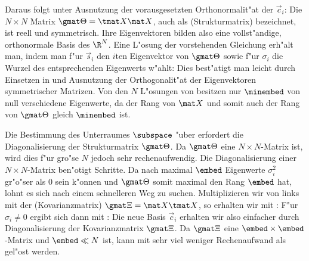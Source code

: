  Daraus folgt unter Ausnutzung der vorausgesetzten Orthonormalit"at der $\vec c_i$:
Die $N\times N$ Matrix $\gmat \Theta = \tmat X \mat X$,  auch
als \begriff(Strukturmatrix) bezeichnet, ist reell und symmetrisch. Ihre
Eigenvektoren bilden also eine vollst"andige, orthonormale Basis des $\R^N$. 
Eine L"osung der vorstehenden Gleichung erh"alt man, indem man f"ur $\vec s_i$ 
den $i$ten Eigenvektor von $\gmat \Theta$ sowie f"ur $\sigma_i$ die Wurzel des entsprechenden Eigenwerts w"ahlt:
Dies best"atigt man leicht durch Einsetzen in  und Ausnutzung der Orthogonalit"at der
Eigenvektoren symmetrischer Matrizen. Von den $N$ L"osungen von 
besitzen nur $\minembed$ von null verschiedene Eigenwerte, da der Rang von $\mat X$
und somit auch der Rang von $\gmat\Theta$ gleich $\minembed$ ist. 


Die Bestimmung des Unterraumes $\subspace$ "uber  erfordert die
Diagonalisierung der Strukturmatrix $\gmat \Theta$. Da $\gmat \Theta$
eine $N\times N$-Matrix ist, wird dies f"ur gro"se $N$ jedoch
sehr rechenaufwendig. Die Diagonalisierung einer $N\times N$-Matrix ben"otigt 
Schritte. 
 Da nach  maximal $\embed$ Eigenwerte
$\sigma_i^2$ gr"o"ser als 0 sein k"onnen und $\gmat \Theta$ somit maximal den Rang
$\embed$ hat, lohnt es sich nach einem schnelleren Weg zu suchen. 
Multiplizieren wir  von links mit der
\begriff(Kovarianzmatrix) $\gmat \Xi = \mat X \tmat X$, so erhalten wir mit :
F"ur $\sigma_i\neq 0$ ergibt sich dann mit :
Die neue Basis $\vec c_i$ erhalten wir  
also einfacher durch Diagonalisierung der Kovarianzmatrix $\gmat \Xi$. Da $\gmat \Xi$ eine
$\embed\times\embed$-Matrix und $\embed\ll N$ ist, kann  mit sehr viel
weniger Rechenaufwand als  gel"ost werden.

